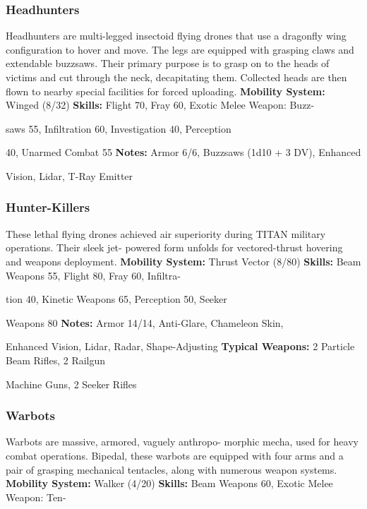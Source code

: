 \subsubsection{Headhunters}

Headhunters are multi-legged insectoid flying drones 
that use a dragonfly wing configuration to hover and 
move. The legs are equipped with grasping claws 
and extendable buzzsaws. Their primary purpose is 
to grasp on to the heads of victims and cut through 
the neck, decapitating them. Collected heads are then 
flown to nearby special facilities for forced uploading. 
\textbf{Mobility System: }Winged (8/32)
\textbf{Skills:} Flight 70, Fray 60, Exotic Melee Weapon: Buzz-

saws 55, Infiltration 60, Investigation 40, Perception 

40, Unarmed Combat 55
\textbf{Notes:} Armor 6/6, Buzzsaws (1d10 + 3 DV), Enhanced 

Vision, Lidar, T-Ray Emitter

\subsubsection{Hunter-Killers}

These\textbf{  }lethal\textbf{  }flying drones achieved air superiority 
during TITAN military operations. Their sleek jet-
powered form unfolds for vectored-thrust hovering 
and weapons deployment.
\textbf{Mobility System: }Thrust Vector (8/80)
\textbf{Skills:} Beam Weapons 55, Flight 80, Fray 60, Infiltra-

tion 40, Kinetic Weapons 65, Perception 50, Seeker 

Weapons 80
\textbf{Notes:} Armor 14/14, Anti-Glare, Chameleon Skin, 

Enhanced Vision, Lidar, Radar, Shape-Adjusting 
\textbf{Typical Weapons:} 2 Particle Beam Rifles, 2 Railgun 

Machine Guns, 2 Seeker Rifles

\subsubsection{Warbots}

Warbots are massive, armored, vaguely anthropo-
morphic mecha, used for heavy combat operations. 
Bipedal, these warbots are equipped with four arms 
and a pair of grasping mechanical tentacles, along 
with numerous weapon systems.
\textbf{Mobility System: }Walker (4/20)
\textbf{Skills:} Beam Weapons 60, Exotic Melee Weapon: Ten-

